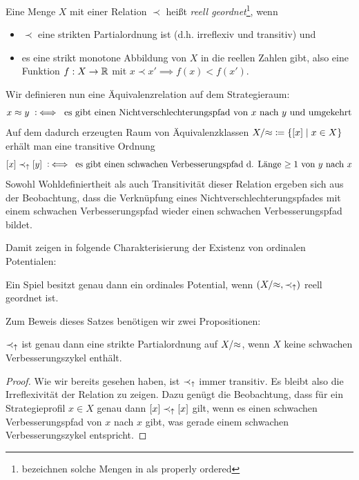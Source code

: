 \begin{defn}
	Eine Menge $X$ mit einer Relation $\prec$ heißt \emph{reell geordnet}\footnote{\citeauthor{CharExOrdPot} bezeichnen solche Mengen in \cite{CharExOrdPot} als \glqq properly ordered\grqq}, wenn 
	\begin{itemize}
		\item $\prec$ eine strikten Partialordnung ist (d.h. irreflexiv und transitiv) und 
		\item es eine strikt monotone Abbildung von $X$ in die reellen Zahlen gibt, also eine Funktion $f: X \to \mathbb{R}$ mit $x \prec x' \implies f(x) < f(x')$.
	\end{itemize}
\end{defn}

Wir definieren nun eine Äquivalenzrelation auf dem Strategieraum:
	\[x \approx y \mathbin{~\mathop:\!\!\iff} \text{ es gibt einen Nichtverschlechterungspfad von $x$ nach $y$ und umgekehrt}\]
Auf dem dadurch erzeugten Raum von Äquivalenzklassen $X/{\approx} \coloneqq \left\lbrace[x] \mid x \in X\right\rbrace$ erhält man eine transitive Ordnung
	\[[x] \prec_\uparrow [y] \mathbin{~\mathop:\!\!\iff} \text{ es gibt einen schwachen Verbesserungspfad d. Länge $\geq1$ von $y$ nach $x$}\]
Sowohl Wohldefiniertheit als auch Transitivität dieser Relation ergeben sich aus der Beobachtung, dass die Verknüpfung eines Nichtverschlechterungspfades mit einem schwachen Verbesserungspfad wieder einen schwachen Verbesserungspfad bildet. 

Damit zeigen \citeauthor{CharExOrdPot} in \cite[Theorem 3.1]{CharExOrdPot} folgende Charakterisierung der Existenz von ordinalen Potentialen:

\begin{satz}\label{satz:CharOrdPot}
	Ein Spiel besitzt genau dann ein ordinales Potential, wenn $(X/{\approx}, \prec_\uparrow)$ reell geordnet ist.
\end{satz}

Zum Beweis dieses Satzes benötigen wir zwei Propositionen:

\begin{prop}\label{prop:SVordStrPO}
	$\prec_\uparrow$ ist genau dann eine strikte Partialordnung auf $X/{\approx}$, wenn $X$ keine schwachen Verbesserungszykel enthält.
\end{prop}

\begin{proof}
	Wie wir bereits gesehen haben, ist $\prec_\uparrow$ immer transitiv. Es bleibt also die Irreflexivität der Relation zu zeigen. Dazu genügt die Beobachtung, dass für ein Strategieprofil $x \in X$ genau dann $[x] \prec_\uparrow [x]$ gilt, wenn es einen schwachen Verbesserungspfad von $x$ nach $x$ gibt, was gerade einem schwachen Verbesserungszykel entspricht.
\end{proof}

